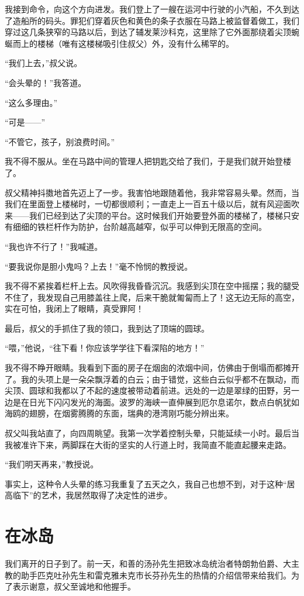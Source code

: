 \documentclass[10pt]{book}
\begin{document}
我接到命令，向这个方向进发。我们登上了一艘在运河中行驶的小汽船，不久到达了造船所的码头。罪犯们穿着灰色和黄色的条子衣服在马路上被监督着做工，我们穿过这几条狭窄的马路以后，到达了辅发莱沙科克，这里除了它外面那绕着尖顶蜿蜒而上的楼梯（唯有这楼梯吸引住叔父）外，没有什么稀罕的。

“我们上去，”叔父说。

“会头晕的！”我答道。

“这么多理由。”

“可是——”

“不管它，孩子，别浪费时间。”

我不得不服从。坐在马路中间的管理人把钥匙交给了我们，于是我们就开始登楼了。

叔父精神抖擞地首先迈上了一步。我害怕地跟随着他，我非常容易头晕。然而，当我们在里面登上楼梯时，一切都很顺利；一直走上一百五十级以后，就有风迎面吹来——我们已经到达了尖顶的平台。这时候我们开始要登外面的楼梯了，楼梯只安有细细的铁栏杆作为防护，台阶越高越窄，似乎可以伸到无限高的空间。

“我也许不行了！”我喊道。

“要我说你是胆小鬼吗？上去！”毫不怜悯的教授说。

我不得不紧挨着栏杆上去。风吹得我昏昏沉沉。我感到尖顶在空中摇摆；我的腿受不住了，我发现自己用膝盖往上爬，后来干脆就匍匐而上了！这无边无际的高空，实在可怕，我闭上了眼睛，真受罪阿！

最后，叔父的手抓住了我的领口，我到达了顶端的圆球。

“喂，”他说，“往下看！你应该学学往下看深陷的地方！”

我不得不睁开眼睛。我看到下面的房子在烟囱的浓烟中间，仿佛由于倒塌而都摊开了。我的头项上是一朵朵飘浮着的白云；由于错觉，这些白云似乎都不在飘动，而尖顶、圆球和我都以了不起的速度被带动着前进。远处的一边是翠绿的田野，另一边是在日光下闪闪发光的海面。波罗的海峡一直伸展到厄尔息诺尔，数点白帆犹如海鸥的翅膀，在烟雾腾腾的东面，瑞典的港湾刚巧能分辨出来。

叔父叫我站直了，向四周眺望。我第一次学着控制头晕，只能延续一小时。最后当我被准许下来，两脚踩在大街的坚实的人行道上时，我简直不能直起腰来走路。

“我们明天再来，”教授说。

事实上，这种令人头晕的练习我重复了五天之久，我自己也想不到，对于这种“居高临下”的艺术，我居然取得了决定性的进步。
\chapter{在冰岛}
我们离开的日子到了。前一天，和善的汤孙先生把致冰岛统治者特朗勃伯爵、大主教的助手匹克吐孙先生和雷克雅未克市长芬孙先生的热情的介绍信带来给我们。为了表示谢意，叔父至诚地和他握手。
\end{document}

